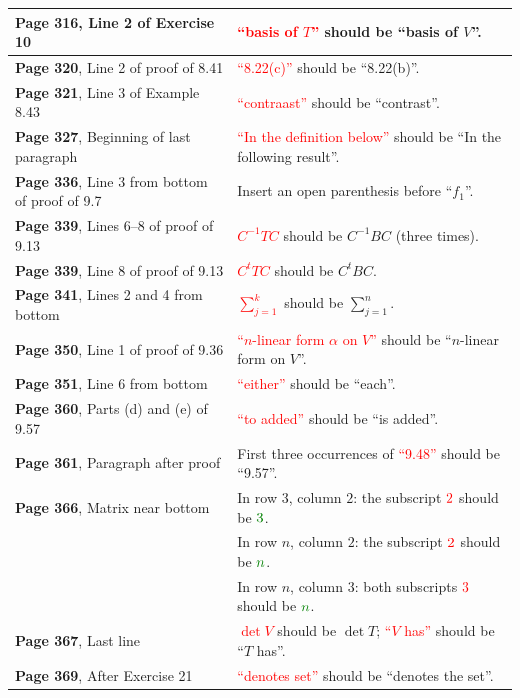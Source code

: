 \documentclass[10pt, a4paper]{article}
\newcommand{\red}[1]{\textcolor{red}{#1}}
\newcommand{\green}[1]{\textcolor{green!50!black}{#1}}
\begin{document}
\begin{longtable}{|R{.46\textwidth}|R{.50\textwidth}|}
	\textbf{Page 316}, Line 2 of Exercise 10 & \red{``basis of $T$''} should be \green{``basis of $V$''}. \\ \hline
	\textbf{Page 320}, Line 2 of proof of 8.41 & \red{``8.22(c)''} should be \green{``8.22(b)''}. \\ \hline
	\textbf{Page 321}, Line 3 of Example 8.43 & \red{``contraast''} should be \green{``contrast''}. \\ \hline
	\textbf{Page 327}, Beginning of last paragraph & \red{``In the definition below''} should be \green{``In the following result''}. \\ \hline
	\textbf{Page 336}, Line 3 from bottom of proof of 9.7 & Insert an open parenthesis before ``$f_1$''. \\ \hline
	\textbf{Page 339}, Lines 6--8 of proof of 9.13 & \red{$C^{-1} T C$} should be \green{$C^{-1} B C$} (three times). \\ \hline
	\textbf{Page 339}, Line 8 of proof of 9.13 & \red{$C^t T C$} should be \green{$C^t B C$}. \\ \hline
	\textbf{Page 341}, Lines 2 and 4 from bottom & \red{$\displaystyle\sum_{j=1}^k$} should be \green{$\displaystyle\sum_{j=1}^n$}. \\ \hline
	\textbf{Page 350}, Line 1 of proof of 9.36 & \red{``$n$-linear form $\alpha$ on $V$''} should be \green{``$n$-linear form on $V$''}. \\ \hline
	\textbf{Page 351}, Line 6 from bottom & \red{``either''} should be \green{``each''}. \\ \hline
	\textbf{Page 360}, Parts (d) and (e) of 9.57 & \red{``to added''} should be \green{``is added''}. \\ \hline
	\textbf{Page 361}, Paragraph after proof & First three occurrences of \red{``9.48''} should be \green{``9.57''}. \\ \hline
	\textbf{Page 366}, Matrix near bottom & In row $3$, column $2$: the subscript $\red{2}$ should be $\green{3}$. \\
																	 & In row $n$, column $2$: the subscript $\red{2}$ should be $\green{n}$. \\
																	 & In row $n$, column $3$: both subscripts $\red{3}$ should be $\green{n}$. \\ \hline
	\textbf{Page 367}, Last line & \red{$\det V$} should be \green{$\det T$}; \red{``$V$ has''} should be \green{``$T$ has''}. \\ \hline
	\textbf{Page 369}, After Exercise 21 & \red{``denotes set''} should be \green{``denotes the set''}. \\ \hline

\end{longtable}
\end{document}
